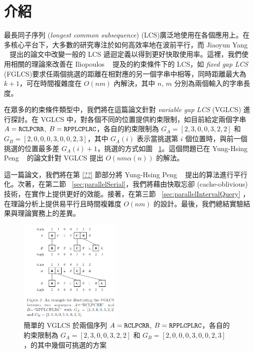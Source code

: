 \documentclass{gapd}
\begin{document}
\maketitle

\section{介紹} %
\label{sec:Introduction}

最長同子序列 (\emph{longest common subsequence}) (LCS)廣泛地使用在各個應用上。在多核心平台下，大多數的研究專注於如何高效率地在波前平行，而 Jiaoyun Yang ~\cite{jiaoyun} 提出的論文中改變一般的 LCS 遞迴定義以得到更好快取使用率。這裡，我們使用相關的理論來改善在 Iliopoulos ~\cite{iliopoulos} 提及的約束條件下的 LCS，如 \emph{fixed gap LCS } (FGLCS)要求任兩個挑選的距離在相對應的另一個字串中相等，同時距離最大為 $k+1$，可在時間複雜度在 $O(nm)$ 內解決，其中 $n$, $m$ 分別為兩個輸入的字串長度。

在眾多的約束條件類型中，我們將在這篇論文針對 \emph{variable gap LCS} (VGLCS) 進行探討。在 VGLCS 中，對各個不同的位置提供約束限制，如目前給定兩個字串 $A = \tt{RCLPCRR}$, $B = \tt{RPPLCPLRC}$，各自的約束限制為 $G_A = [2, 3, 0, 0, 3, 2, 2]$ 和 $G_B = [2, 0, 0, 0, 3, 0, 0, 2, 3]$，其中 $G_A(i)$ 表示當挑選第 $i$ 個位置時，與前一個挑選的位置最多差 $G_A(i)+1$，挑選的方式如圖 ~\ref{fig:VGLCSex}。這個問題已在 Yung-Hsing Peng ~\cite{yunghsing} 的論文針對 VGLCS 提出 $O(nm \alpha(n))$ 的解法。

這一篇論文，我們將在第 \ref{??} 節部分將 Yung-Hsing Peng ~\cite{yunghsing} 提出的算法進行平行化。次著，在第二節 ~\ref{sec:parallelSerial}，我們將藉由快取忘卻 (cache-oblivious) 技術，在實作上提供更好的效能。接著，在第三節 ~\ref{sec:parallelIntervalQuery} ，在理論分析上提供易平行且時間複雜度 $O(nm)$ 的設計。最後，我們總結實驗結果與理論實務上的差異。

\begin{figure}[!thb]
  \centering
  \includegraphics[height=5cm]{figure/fig-VGLCS-ex.png} %
  \caption{簡單的 VGLCS 於兩個序列 $A = \tt{RCLPCRR}$, $B = \tt{RPPLCPLRC}$，各自的約束限制為 $G_A = [2, 3, 0, 0, 3, 2, 2]$ 和 $G_B = [2, 0, 0, 0, 3, 0, 0, 2, 3]$，的其中幾個可挑選的方案}
  \label{fig:VGLCSex}
\end{figure}
\end{document}
